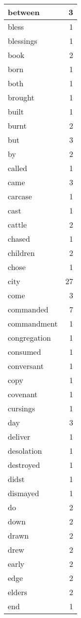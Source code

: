 \begin{center}
\begin{longtable}{l|r}
between & 3\\ \hline 
bless & 1\\ \hline 
blessings & 1\\ \hline 
book & 2\\ \hline 
born & 1\\ \hline 
both & 1\\ \hline 
brought & 1\\ \hline 
built & 1\\ \hline 
burnt & 2\\ \hline 
but & 3\\ \hline 
by & 2\\ \hline 
called & 1\\ \hline 
came & 3\\ \hline 
carcase & 1\\ \hline 
cast & 1\\ \hline 
cattle & 2\\ \hline 
chased & 1\\ \hline 
children & 2\\ \hline 
chose & 1\\ \hline 
city & 27\\ \hline 
come & 3\\ \hline 
commanded & 7\\ \hline 
commandment & 1\\ \hline 
congregation & 1\\ \hline 
consumed & 1\\ \hline 
conversant & 1\\ \hline 
copy & 1\\ \hline 
covenant & 1\\ \hline 
cursings & 1\\ \hline 
day & 3\\ \hline 
deliver & 1\\ \hline 
desolation & 1\\ \hline 
destroyed & 1\\ \hline 
didst & 1\\ \hline 
dismayed & 1\\ \hline 
do & 2\\ \hline 
down & 2\\ \hline 
drawn & 2\\ \hline 
drew & 2\\ \hline 
early & 2\\ \hline 
edge & 2\\ \hline 
elders & 2\\ \hline 
end & 1\\ \hline 

\end{longtable}
\end{center}
